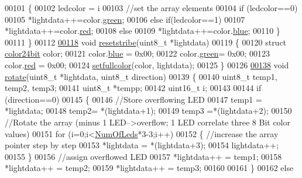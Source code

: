 \begin{DoxyCode}
00101     \{
00102         ledcolor = i%
00103         \textcolor{comment}{//set the array elements}
00104         \textcolor{keywordflow}{if} (ledcolor==0)
00105             *lightdata++=color.\hyperlink{structcolor24bit_a90d21fa503b626c00cdc8d94863d5877}{green};  
00106         \textcolor{keywordflow}{else} \textcolor{keywordflow}{if}(ledcolor==1)
00107             *lightdata++=color.\hyperlink{structcolor24bit_ad47d918910aaa51c73160ac85999d09c}{red};      
00108         \textcolor{keywordflow}{else}
00109             *lightdata++=color.\hyperlink{structcolor24bit_a287b397e90d7b995c81ff54e741f96b2}{blue};
00110     \}
00111 \}
00112 
\hypertarget{_led_effects_8c_source_l00118}{}\hyperlink{_led_effects_8h_a1c5e6b0f45c1787c25f8eafa8b9c6247}{00118} \textcolor{keywordtype}{void} \hyperlink{_led_effects_8c_a1c5e6b0f45c1787c25f8eafa8b9c6247}{resetstribe}(uint8\_t *lightdata)
00119 \{
00120     \textcolor{keyword}{struct }\hyperlink{structcolor24bit}{color24bit} color;
00121     color.\hyperlink{structcolor24bit_a287b397e90d7b995c81ff54e741f96b2}{blue} = 0x00;
00122     color.\hyperlink{structcolor24bit_a90d21fa503b626c00cdc8d94863d5877}{green}= 0x00;
00123     color.\hyperlink{structcolor24bit_ad47d918910aaa51c73160ac85999d09c}{red} = 0x00;
00124     \hyperlink{_led_effects_8c_a2d54d1a6c61fe667b7c68ff04a11c503}{setfullcolor}(color, lightdata);
00125 \}
00126 
\hypertarget{_led_effects_8c_source_l00138}{}\hyperlink{_led_effects_8h_afd64325b08e785d37b4dfaf358e517f0}{00138} \textcolor{keywordtype}{void} \hyperlink{_led_effects_8c_afd64325b08e785d37b4dfaf358e517f0}{rotate}(uint8\_t *lightdata, uint8\_t direction)
00139 \{
00140     uint8\_t temp1, temp2, temp3;
00141     uint8\_t *tempp;
00142     uint16\_t i;
00143     
00144     \textcolor{keywordflow}{if} (direction==0)
00145     \{
00146         \textcolor{comment}{//Store overflowing LED}
00147         temp1 = *lightdata;
00148         temp2= *(lightdata+1);
00149         temp3 =*(lightdata+2);
00150         \textcolor{comment}{//Rotate the array (minus 1 LED-->overflow; 1 LED correlate three 8 Bit color values)}
00151         \textcolor{keywordflow}{for} (i=0;i<\hyperlink{globals_8h_ad5db4045aed262ed4aae2af9d81fab98}{NumOfLeds}*3-3;i++)
00152         \{   \textcolor{comment}{//increase the array pointer step by step}
00153             *lightdata = *(lightdata+3);
00154             lightdata++;
00155         \}
00156         \textcolor{comment}{//assign overflowed LED}
00157         *lightdata++ = temp1;
00158         *lightdata++ = temp2;
00159         *lightdata++ = temp3;
00160         
00161     \}
00162     \textcolor{keywordflow}{else}

\end{DoxyCode}
